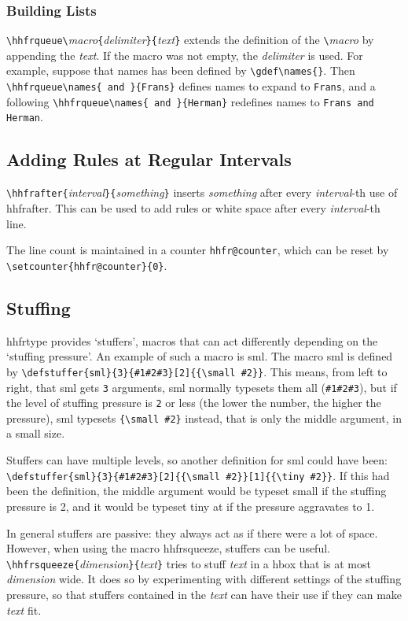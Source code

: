\documentclass[11pt]{article}
\makeatletter
\def\packagename#1{{\sffamily #1}}     %
\def\macroname#1{{\ttfamily\@ttbs#1}}  %
\def\hhfrtype{\packagename{hhfrtype}\xspace}
\def\={\verb=}
\def\<#1>{\macroname{#1}}
\makeatother
\begin{document}
\subsubsection{Building Lists}

\=\hhfrqueue\=\textit{macro}\={=\textit{delimiter}\=}{=\textit{text}\=}=
extends the definition of the \=\=\textit{macro} by appending the
\textit{text}. If the macro was not empty, the \textit{delimiter} is used.
For example, suppose that \<names> has been defined by \=\gdef\names{}=.
Then \=\hhfrqueue\names{ and }{Frans}= defines \<names> to expand to
\texttt{Frans}, and a following \=\hhfrqueue\names{ and }{Herman}= redefines
\<names> to \texttt{Frans and Herman}.

\subsection{Adding Rules at Regular Intervals}

\=\hhfrafter{=\textit{interval}\=}{=\textit{something}\=}= inserts
\textit{something} after every \textit{interval}-th use
of \<hhfrafter>. This can be used to add rules or white space after every
\textit{interval}-th line.

The line count is maintained in a counter \texttt{hhfr@counter},
which can be reset by \=\setcounter{hhfr@counter}{0}=.

\subsection{Stuffing}

\hhfrtype provides `stuffers', macros that can act differently
depending on the `stuffing pressure'. An example of such a macro
is \<sml>. The macro \<sml> is defined by
\=\defstuffer{sml}{3}{#1#2#3}[2]{{\small #2}}=.
This means, from left to right, that \<sml> gets \=3= arguments,
\<sml> normally typesets them all (\=#1#2#3=), but if the level of
stuffing pressure is \=2= or less (the lower the number, the
higher the pressure), \<sml> typesets \={\small #2}= instead,
that is only the middle argument, in a small size.

Stuffers can have multiple levels, so another definition for
\<sml> could have been: \=\defstuffer{sml}{3}{#1#2#3}[2]{{\small #2}}[1]{{\tiny #2}}=.
If this had been the definition, the middle argument would be typeset
small if the stuffing pressure is 2, and it would be typeset tiny at
if the pressure aggravates to 1.

In general stuffers are passive: they always act as if there were a
lot of space. However, when using the macro \<hhfrsqueeze>, stuffers
can be useful. \=\hhfrsqueeze{=\textit{dimension}\=}{=\textit{text}\=}=
tries to stuff \textit{text} in a \<hbox> that is at most \textit{dimension}
wide. It does so by experimenting with different settings of the
stuffing pressure, so that stuffers contained in the \textit{text}
can have their use if they can make \textit{text} fit.
\end{document}
